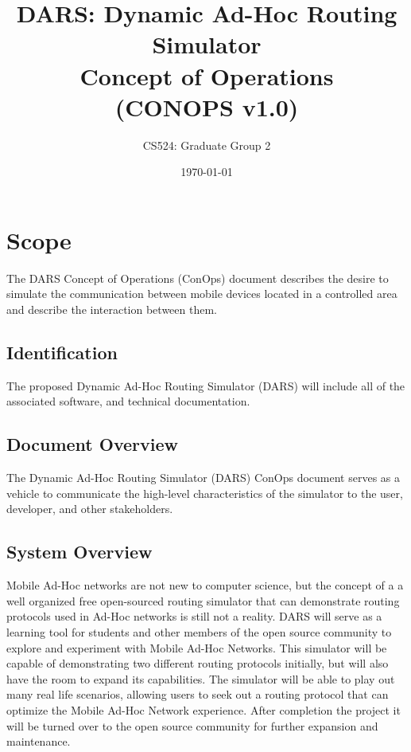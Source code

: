 \documentclass[a4paper,11pt,titlepage]{article}
\begin{document}
\author{CS524: Graduate Group 2}
\title{﻿DARS: Dynamic Ad-Hoc Routing Simulator\\
       Concept of Operations\\
       (CONOPS v1.0)}
\date{\today}

\maketitle

\tableofcontents
\newpage


\section{Scope}
The DARS Concept of Operations (ConOps) document describes the desire to simulate the communication between mobile devices located in a controlled area and describe the interaction between them. 


\subsection{Identification}
The proposed Dynamic Ad-Hoc Routing Simulator (DARS) will include all of the associated software, and technical documentation. 
 
\subsection{Document Overview}
The Dynamic Ad-Hoc Routing Simulator (DARS) ConOps document serves as a vehicle to communicate the high-level characteristics of the simulator to the user, developer, and other stakeholders.
 
\subsection{System Overview}
Mobile Ad-Hoc networks are not new to computer science, but the concept of a a well organized free open-sourced routing simulator that can demonstrate routing protocols used in Ad-Hoc networks is still not a reality. DARS will serve as a learning tool for students and other members of the open source community to explore and experiment with Mobile Ad-Hoc Networks.  This simulator will be capable of demonstrating two different routing protocols initially, but will also have the room to expand its capabilities.  The simulator will be able to play out many real life scenarios, allowing users to seek out a routing protocol that can optimize the Mobile Ad-Hoc Network experience.  After completion the project it will be turned over to the open source community for further expansion and maintenance.   
 
\end{document}
